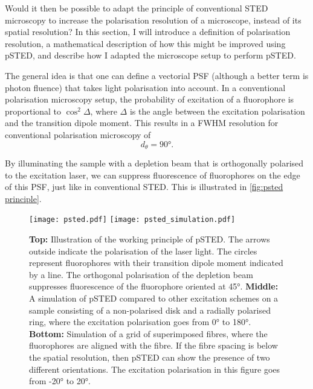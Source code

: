 Would it then be possible to adapt the principle of conventional STED microscopy to increase the polarisation resolution of a microscope, instead of its spatial resolution? In this section, I will introduce a definition of polarisation resolution, a mathematical description of how this might be improved using pSTED, and describe how I adapted the microscope setup to perform pSTED. 

The general idea is that one can define a vectorial PSF (although a better term is photon fluence) that takes light polarisation into account. In a conventional polarisation microscopy setup, the probability of excitation of a fluorophore is proportional to $ \cos^2 \Delta $, where $ \Delta $ is the angle between the excitation polarisation and the transition dipole moment. This results in a FWHM resolution for conventional polarisation microscopy of 
\begin{equation}
	d_\theta = \ang{90}.
\end{equation}

By illuminating the sample with a depletion beam that is orthogonally polarised to the excitation laser, we can suppress fluorescence of fluorophores on the edge of this PSF, just like in conventional STED. This is illustrated in \autoref{fig:psted principle}.

\begin{figure}
	\centering
	\texttt{[image: psted.pdf]}
	\texttt{[image: psted\_simulation.pdf]}
	\caption{
		\textbf{Top:} Illustration of the working principle of pSTED. The arrows outside indicate the polarisation of the laser light. The circles represent fluorophores with their transition dipole moment indicated by a line. The orthogonal polarisation of the depletion beam suppresses fluorescence of the fluorophore oriented at \ang{45}.
		\textbf{Middle:} A simulation of pSTED compared to other excitation schemes on a sample consisting of a non-polarised disk and a radially polarised ring, where the excitation polarisation goes from \ang{0} to \ang{180}.
		\textbf{Bottom:} Simulation of a grid of superimposed fibres, where the fluorophores are aligned with the fibre. If the fibre spacing is below the spatial resolution, then pSTED can show the presence of two different orientations. The excitation polarisation in this figure goes from \ang{-20} to \ang{+20}.
	}
	\label{fig:psted principle}
\end{figure}

